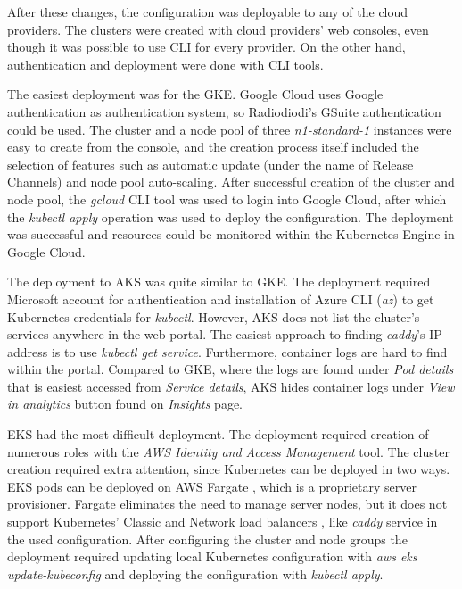 \documentclass[article]{aaltoseries}
\begin{document}
After these changes, the configuration was deployable to any of the cloud providers. The clusters were created with cloud providers' web consoles, even though it was possible to use CLI for every provider. On the other hand, authentication and deployment were done with CLI tools.

The easiest deployment was for the GKE. Google Cloud uses Google authentication as authentication system, so Radiodiodi's GSuite authentication could be used. The cluster and a node pool of three \textit{n1-standard-1} instances were easy to create from the console, and the creation process itself included the selection of features such as automatic update (under the name of Release Channels) and node pool auto-scaling. After successful creation of the cluster and node pool, the \textit{gcloud} CLI tool was used to login into Google Cloud, after which the \textit{kubectl apply} operation was used to deploy the configuration. The deployment was successful and resources could be monitored within the Kubernetes Engine in Google Cloud.

The deployment to AKS was quite similar to GKE. The deployment required Microsoft account for authentication and installation of Azure CLI (\textit{az}) to get Kubernetes credentials for \textit{kubectl}. However, AKS does not list the cluster's services anywhere in the web portal. The easiest approach to finding \textit{caddy}'s IP address is to use \textit{kubectl get service}. Furthermore, container logs are hard to find within the portal. Compared to GKE, where the logs are found under \textit{Pod details} that is easiest accessed from \textit{Service details}, AKS hides container logs under \textit{View in analytics} button found on \textit{Insights} page.

EKS had the most difficult deployment. The deployment required creation of numerous roles with the \textit{AWS Identity and Access Management} tool. The cluster creation required extra attention, since Kubernetes can be deployed in two ways. EKS pods can be deployed on AWS Fargate \cite{fargate}, which is a proprietary server provisioner. Fargate eliminates the need to manage server nodes, but it does not support Kubernetes' Classic and Network load balancers \cite{ekslb}, like \textit{caddy} service in the used configuration. After configuring the cluster and node groups the deployment required updating local Kubernetes configuration with \textit{aws eks update-kubeconfig} and deploying the configuration with \textit{kubectl apply}.
\end{document}
